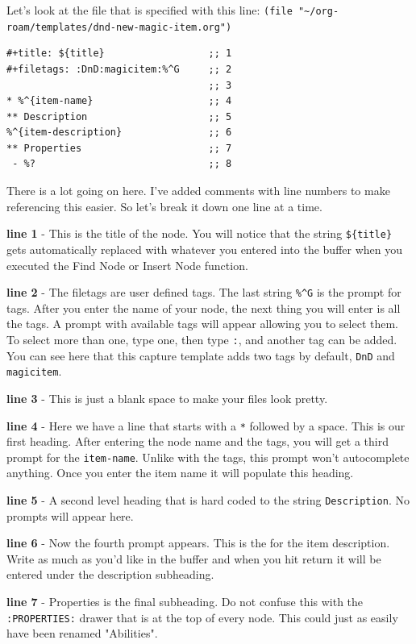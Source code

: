 \documentclass[11pt]{article}
\begin{document}
Let's look at the file that is specified with this line: \texttt{(file "\textasciitilde{}/org-roam/templates/dnd-new-magic-item.org")}

\begin{verbatim}
#+title: ${title}                  ;; 1
#+filetags: :DnD:magicitem:%^G     ;; 2
                                   ;; 3
* %^{item-name}                    ;; 4
** Description                     ;; 5
%^{item-description}               ;; 6
** Properties                      ;; 7
 - %?                              ;; 8
\end{verbatim}

There is a lot going on here. I've added comments with line numbers to make referencing this easier. So let's break it down one line at a time.

\textbf{line 1} - This is the title of the node. You will notice that the string \texttt{\$\{title\}} gets automatically replaced with whatever you entered into the buffer when you executed the Find Node or Insert Node function.

\textbf{line 2} - The filetags are user defined tags. The last string \texttt{\%\textasciicircum{}G} is the prompt for tags. After you enter the name of your node, the next thing you will enter is all the tags. A prompt with available tags will appear allowing you to select them. To select more than one, type one, then type \texttt{:}, and another tag can be added. You can see here that this capture template adds two tags by default, \texttt{DnD} and \texttt{magicitem}.

\textbf{line 3} - This is just a blank space to make your files look pretty.

\textbf{line 4} - Here we have a line that starts with a \texttt{*} followed by a space. This is our first heading. After entering the node name and the tags, you will get a third prompt for the \texttt{item-name}. Unlike with the tags, this prompt won't autocomplete anything. Once you enter the item name it will populate this heading.

\textbf{line 5} - A second level heading that is hard coded to the string \texttt{Description}. No prompts will appear here.

\textbf{line 6} - Now the fourth prompt appears. This is the for the item description. Write as much as you'd like in the buffer and when you hit return it will be entered under the description subheading.

\textbf{line 7} - Properties is the final subheading. Do not confuse this with the \texttt{:PROPERTIES:} drawer that is at the top of every node. This could just as easily have been renamed "Abilities".
\end{document}
